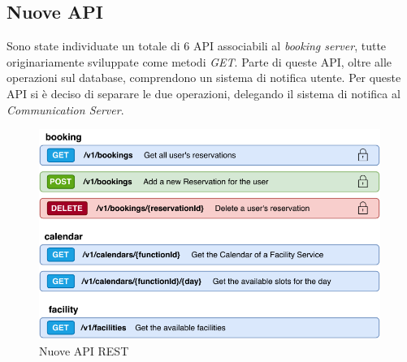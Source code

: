 \subsection{Nuove API}
Sono state individuate un totale di 6 API associabili al \emph{booking server}, tutte originariamente sviluppate come metodi \emph{GET}. Parte di queste API, oltre alle operazioni sul database, comprendono un sistema di notifica utente. Per queste API si è deciso di separare le due operazioni, delegando il sistema di notifica al \emph{Communication Server}.
\begin{figure}[H]
    \centering
    \includegraphics[width=0.99\textwidth]{images/03_3_new_rest_api.pdf}
    \caption{Nuove API REST}
    \label{fig:newrestapi}
\end{figure}


